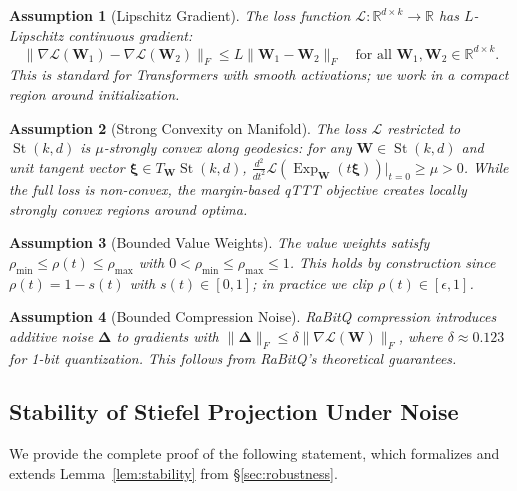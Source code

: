 \documentclass[twocolumn]{article}
\newtheorem{assumption}{Assumption}
\DeclareMathOperator{\St}{St}
\DeclareMathOperator{\Exp}{Exp}
\begin{document}
\begin{assumption}[Lipschitz Gradient]\label{ass:lipschitz}
The loss function $\mathcal{L}: \mathbb{R}^{d \times k} \to \mathbb{R}$ has $L$-Lipschitz continuous gradient:
\[
\|\nabla \mathcal{L}(\mathbf{W}_1) - \nabla \mathcal{L}(\mathbf{W}_2)\|_F \leq L \|\mathbf{W}_1 - \mathbf{W}_2\|_F
\quad \text{for all } \mathbf{W}_1, \mathbf{W}_2 \in \mathbb{R}^{d \times k}.
\]
This is standard for Transformers with smooth activations; we work in a compact region around initialization.
\end{assumption}

\begin{assumption}[Strong Convexity on Manifold]\label{ass:strong_conv}
The loss $\mathcal{L}$ restricted to $\St(k,d)$ is $\mu$-strongly convex along geodesics: for any $\mathbf{W} \in \St(k,d)$ and unit tangent vector $\boldsymbol{\xi} \in T_{\mathbf{W}}\St(k,d)$,
$\frac{d^2}{dt^2} \mathcal{L}(\Exp_{\mathbf{W}}(t\boldsymbol{\xi}))\big|_{t=0} \geq \mu > 0$.
While the full loss is non-convex, the margin-based qTTT objective creates locally strongly convex regions around optima.
\end{assumption}

\begin{assumption}[Bounded Value Weights]\label{ass:value_weights}
The value weights satisfy $\rho_{\min} \leq \rho(t) \leq \rho_{\max}$ with $0 < \rho_{\min} \leq \rho_{\max} \leq 1$. This holds by construction since $\rho(t) = 1 - s(t)$ with $s(t) \in [0,1]$; in practice we clip $\rho(t) \in [\epsilon, 1]$.
\end{assumption}

\begin{assumption}[Bounded Compression Noise]\label{ass:compression}
RaBitQ compression introduces additive noise $\boldsymbol{\Delta}$ to gradients with $\|\boldsymbol{\Delta}\|_F \leq \delta \|\nabla \mathcal{L}(\mathbf{W})\|_F$, where $\delta \approx 0.123$ for 1-bit quantization. This follows from RaBitQ's theoretical guarantees.
\end{assumption}

\subsection{Stability of Stiefel Projection Under Noise}

We provide the complete proof of the following statement, which formalizes and extends Lemma~\ref{lem:stability} from \S\ref{sec:robustness}.
\end{document}
